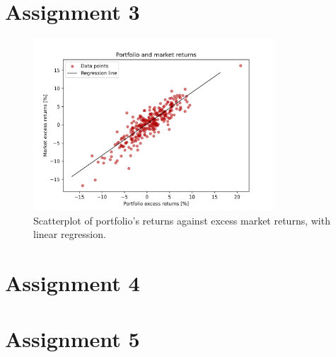 \documentclass[12pt, openright, twoside]{report}
\begin{document}
\section*{Assignment 3}
\begin{figure}[h]
    \centering
    \includegraphics[width=0.8\textwidth]{images/portfolio_regression.png}
    \caption{Scatterplot of portfolio's returns against excess market returns, with linear regression.}\label{fig:portfolio_regression}
\end{figure}
\section*{Assignment 4}

\section*{Assignment 5}
\end{document}
